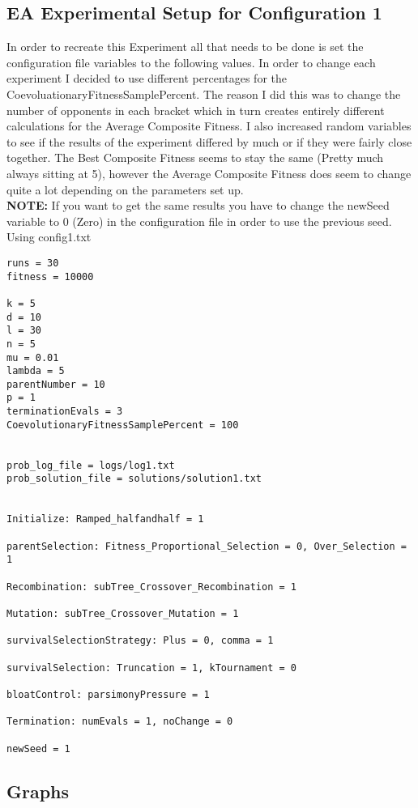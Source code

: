 \documentclass[•]{article}
\begin{document}
\subsection{EA Experimental Setup for Configuration 1}
\indent \indent In order to recreate this Experiment all that needs to be done is set the configuration file variables to the following values.  In order to change each experiment I decided to use different percentages for the CoevoluationaryFitnessSamplePercent.  The reason I did this was to change the number of opponents in each bracket which in turn creates entirely different calculations for the Average Composite Fitness.  I also increased random variables to see if the results of the experiment differed by much or if they were fairly close together.  The Best Composite Fitness seems to stay the same (Pretty much always sitting at 5), however the Average Composite Fitness does seem to change quite a lot depending on the parameters set up.\\
\indent \textbf{NOTE:} If you want to get the same results you have to change the newSeed variable to 0 (Zero) in the configuration file in order to use the previous seed.\\

Using config1.txt 
\begin{lstlisting}
runs = 30
fitness = 10000

k = 5
d = 10
l = 30
n = 5
mu = 0.01
lambda = 5
parentNumber = 10
p = 1
terminationEvals = 3
CoevolutionaryFitnessSamplePercent = 100


prob_log_file = logs/log1.txt
prob_solution_file = solutions/solution1.txt


Initialize: Ramped_halfandhalf = 1

parentSelection: Fitness_Proportional_Selection = 0, Over_Selection = 1

Recombination: subTree_Crossover_Recombination = 1

Mutation: subTree_Crossover_Mutation = 1

survivalSelectionStrategy: Plus = 0, comma = 1

survivalSelection: Truncation = 1, kTournament = 0

bloatControl: parsimonyPressure = 1

Termination: numEvals = 1, noChange = 0

newSeed = 1
\end{lstlisting}

\subsection{Graphs}
\end{document}
